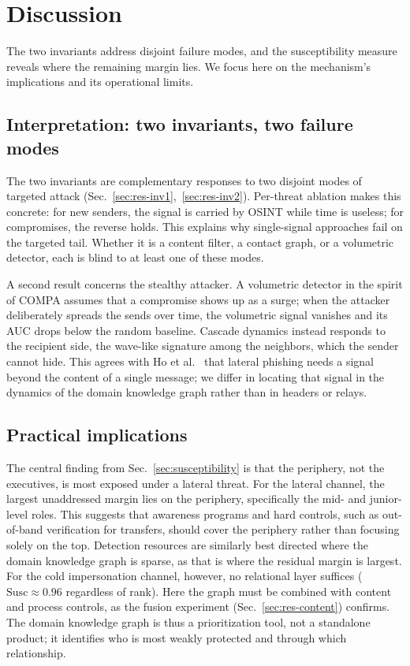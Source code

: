 \section{Discussion}
\label{sec:discussion}

The two invariants address disjoint failure modes, and the susceptibility measure reveals where the remaining
margin lies. We focus here on the mechanism's implications and its operational limits.

\subsection{Interpretation: two invariants, two failure modes}
The two invariants are complementary responses to two disjoint modes of targeted attack
(Sec.~\ref{sec:res-inv1},~\ref{sec:res-inv2}). Per-threat ablation makes this concrete: for
new senders, the signal is carried by OSINT while time is useless; for compromises, the reverse holds. This explains
why single-signal approaches fail on the targeted tail. Whether it is a content filter, a contact graph, or a volumetric detector,
each is blind to at least one of these modes.

A second result concerns the stealthy attacker. A volumetric detector in the spirit of COMPA
\citep{stringhini2015thataint} assumes that a compromise shows up as a surge; when the attacker deliberately
spreads the sends over time, the volumetric signal vanishes and its AUC drops below the random baseline. Cascade dynamics instead
responds to the recipient side, the wave-like signature among the neighbors, which the sender cannot hide. This agrees
with Ho et al.\ \citep{ho2019detecting} that lateral phishing needs a signal beyond the content of a single
message; we differ in locating that signal in the dynamics of the domain knowledge graph rather than in headers
or relays.

\subsection{Practical implications}
The central finding from Sec.~\ref{sec:susceptibility} is that the periphery, not the executives, is most exposed under a lateral threat. For the lateral channel, the largest unaddressed margin lies on the periphery, specifically the mid- and junior-level roles. This suggests that awareness programs and hard controls, such as out-of-band verification for transfers, should cover the periphery rather than focusing solely on the top. Detection resources are similarly best directed where the domain
knowledge graph is sparse, as that is where the residual margin is largest. For the cold impersonation
channel, however, no relational layer suffices ($\mathrm{Susc}\!\approx\!0.96$ regardless of rank). Here the graph must
be combined with content and process controls, as the fusion experiment (Sec.~\ref{sec:res-content}) confirms.
The domain knowledge graph is thus a prioritization tool, not a standalone product; it identifies
who is most weakly protected and through which relationship.

